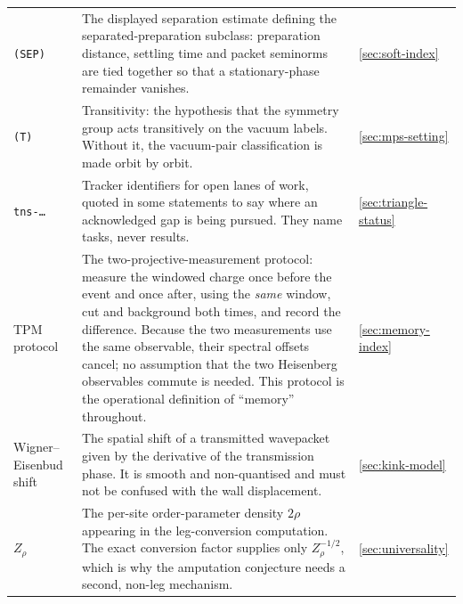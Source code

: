{\begin{longtable}{@{}p{}p{}p{}@{}}
\texttt{(SEP)} & The displayed separation estimate defining the
separated-preparation subclass: preparation distance, settling time and packet
seminorms are tied together so that a stationary-phase remainder vanishes. & \cref{sec:soft-index}\\

\texttt{(T)} & Transitivity: the hypothesis that the symmetry group acts
transitively on the vacuum labels. Without it, the vacuum-pair classification
is made orbit by orbit. & \cref{sec:mps-setting}\\

\texttt{tns-\dots} & Tracker identifiers for open lanes of work, quoted in
some statements to say where an acknowledged gap is being pursued. They name
tasks, never results. & \cref{sec:triangle-status}\\

TPM protocol & The two-projective-measurement protocol: measure the windowed
charge once before the event and once after, using the \emph{same} window,
cut and background both times, and record the difference. Because the two
measurements use the same observable, their spectral offsets cancel; no
assumption that the two Heisenberg observables commute is needed. This
protocol is the operational definition of ``memory'' throughout. & \cref{sec:memory-index}\\

Wigner--Eisenbud shift & The spatial shift of a transmitted wavepacket given
by the derivative of the transmission phase. It is smooth and non-quantised
and must not be confused with the wall displacement. & \cref{sec:kink-model}\\

$Z_\rho$ & The per-site order-parameter density $2\rho$ appearing in the
leg-conversion computation. The exact conversion factor supplies only
$Z_\rho^{-1/2}$, which is why the amputation conjecture needs a second,
non-leg mechanism. & \cref{sec:universality}\\
\end{longtable}
}
